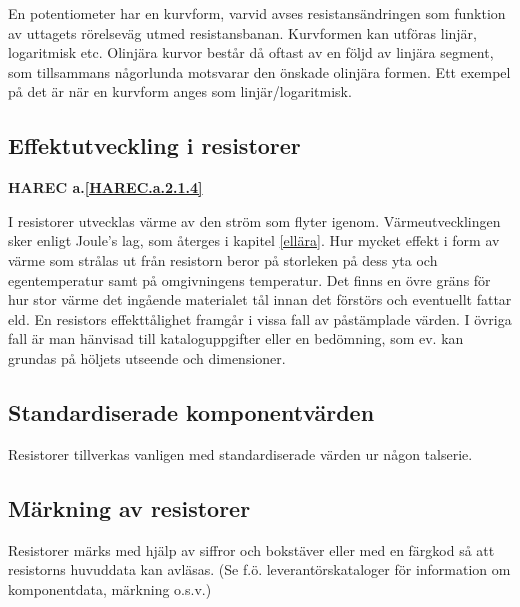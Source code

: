 En potentiometer har en kurvform, varvid avses resistansändringen som funktion
av uttagets rörelseväg utmed resistansbanan. Kurvformen kan utföras linjär,
logaritmisk etc. Olinjära kurvor består då oftast av en följd av linjära
segment, som tillsammans någorlunda motsvarar den önskade olinjära formen. Ett
exempel på det är när en kurvform anges som linjär/logaritmisk.

\subsection{Effektutveckling i resistorer}
\textbf{HAREC a.\ref{HAREC.a.2.1.4}\label{myHAREC.a.2.1.4}}

I resistorer utvecklas värme av den ström som flyter igenom. Värmeutvecklingen
sker enligt Joule's lag, som återges i kapitel \ref{ellära}. Hur mycket effekt i form av
värme som strålas ut från resistorn beror på storleken på dess yta och
egentemperatur samt på omgivningens temperatur. Det finns en övre gräns för hur
stor värme det ingående materialet tål innan det förstörs och eventuellt fattar
eld. En resistors effekttålighet framgår i vissa fall av påstämplade värden.
I övriga fall är man hänvisad till kataloguppgifter eller en bedömning, som ev.
kan grundas på höljets utseende och dimensioner.

\subsection{Standardiserade komponentvärden}

Resistorer tillverkas vanligen med standardiserade värden ur någon talserie.

\subsection{Märkning av resistorer}

Resistorer märks med hjälp av siffror och bokstäver eller med en färgkod så att
resistorns huvuddata kan avläsas.
(Se f.ö. leverantörskataloger för information om komponentdata, märkning o.s.v.)

